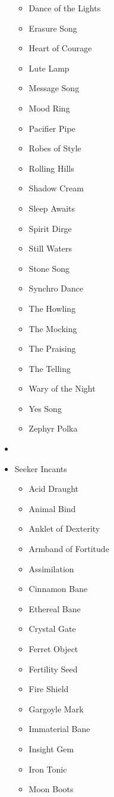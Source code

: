 \begin{itemize}[leftmargin=0pt]
\begin{itemize}[leftmargin=0pt]
		\item[] Dance of the Lights
		\item[] Erasure Song
		\item[] Heart of Courage
		\item[] Lute Lamp
		\item[] Message Song
		\item[] Mood Ring
		\item[] Pacifier Pipe
		\item[] Robes of Style
		\item[] Rolling Hills
		\item[] Shadow Cream
		\item[] Sleep Awaits
		\item[] Spirit Dirge
		\item[] Still Waters
		\item[] Stone Song
		\item[] Synchro Dance
		\item[] The Howling
		\item[] The Mocking
		\item[] The Praising
		\item[] The Telling
		\item[] Wary of the Night
		\item[] Yes Song
		\item[] Zephyr Polka
	\end{itemize}
	\item[] 
	\item[] Seeker Incants
	\begin{itemize}[leftmargin=0pt]
		\item[] Acid Draught
		\item[] Animal Bind
		\item[] Anklet of Dexterity
		\item[] Armband of Fortitude
		\item[] Assimilation
		\item[] Cinnamon Bane
		\item[] Ethereal Bane
		\item[] Crystal Gate
		\item[] Ferret Object
		\item[] Fertility Seed
		\item[] Fire Shield
		\item[] Gargoyle Mark
		\item[] Immaterial Bane
		\item[] Insight Gem
		\item[] Iron Tonic
		\item[] Moon Boots

\end{itemize}
\end{itemize}
